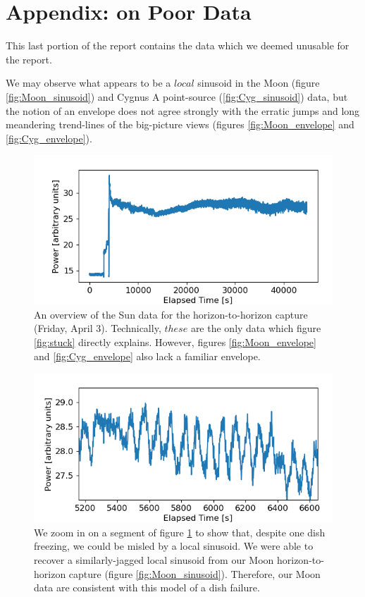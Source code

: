 \documentclass[12pt]{article}
\begin{document}
\section{Appendix: on Poor Data}

\quad \quad This last portion of the report contains the data which we deemed unusable for the report.

We may observe what appears to be a $local$ sinusoid in the Moon (figure \ref{fig:Moon_sinusoid}) and Cygnus A point-source (\ref{fig:Cyg_sinusoid}) data, but the notion of an envelope does not agree strongly with the erratic jumps and long meandering trend-lines of the big-picture views (figures \ref{fig:Moon_envelope} and \ref{fig:Cyg_envelope}).

\begin{figure}
	\centering
	\includegraphics[width=.6\linewidth]{envelope/Sun_h2h}
	\caption{An overview of the Sun data for the horizon-to-horizon capture (Friday, April 3). Technically, $these$ are the only data which figure \ref{fig:stuck} directly explains. However, figures \ref{fig:Moon_envelope} and \ref{fig:Cyg_envelope} also lack a familiar envelope.}
	\label{fig:Sun_h2h_envelope}
\end{figure}

\begin{figure}
	\centering
	\includegraphics[width=.6\linewidth]{sinusoid/Sun_h2h}
	\caption{We zoom in on a segment of figure \ref{fig:Sun_h2h_envelope} to show that, despite one dish freezing, we could be misled by a local sinusoid. We were able to recover a similarly-jagged local sinusoid from our Moon horizon-to-horizon capture (figure \ref{fig:Moon_sinusoid}). Therefore, our Moon data are consistent with this model of a dish failure.}
	\label{fig:Sun_h2h_sinusoid}
\end{figure}
\end{document}
